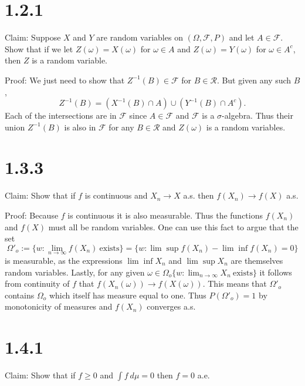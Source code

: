 \documentclass[10pt]{article}
\begin{document}
\section*{1.2.1}

Claim: Suppose $X$ and $Y$ are random variables on 
$(\Omega, \mathcal{F}, P)$ and let $A \in \mathcal{F}$.
Show that if we let $Z(\omega) = X(\omega)$ for $\omega \in A$
and $Z(\omega) = Y(\omega)$ for $\omega \in A^c$,
then $Z$ is a random variable.

Proof: We just need to show that $Z^{-1}(B) \in \mathcal{F}$
for $B \in \mathcal{R}$. But given any such $B$,
\begin{equation*}
  Z^{-1}(B) = (X^{-1}(B) \cap A) \cup (Y^{-1}(B) \cap A^c).
\end{equation*}
Each of the intersections are in $\mathcal{F}$ 
since $A \in \mathcal{F}$ and $\mathcal{F}$ is a $\sigma$-algebra.
Thus their union $Z^{-1}(B)$ is also in $\mathcal{F}$
for any $B \in \mathcal{R}$ and $Z(\omega)$ is 
a random variables. 

\section*{1.3.3}

Claim: Show that if $f$ is continuous and $X_n \to X$ a.s.
then $f(X_n) \to f(X)$ a.s.

Proof: Because $f$ is continuous it is also measurable.
Thus the functions $f(X_n)$ and $f(X)$ must all be random variables.
One can use this fact to argue that the set
\begin{equation*}
  \Omega'_o:= \{w: \lim_{n \to \infty} f(X_n) \ \text{exists}\}
  = \{w: \lim \sup f(X_n) - \lim \inf f(X_n) = 0\}
\end{equation*}
is measurable, as the expressions $\lim \inf X_n$ and $\lim \sup X_n$
are themselves random variables.
Lastly, for any given 
$\omega \in \Omega_o \{w: \lim_{n \to \infty} X_n \ \text{exists}\}$
it follows from continuity of $f$ that $f(X_n(\omega)) \to f(X(\omega))$.
This means that $\Omega'_o$ contains $\Omega_o$ which itself has measure
equal to one. Thus $P(\Omega'_o) = 1$ by monotonicity of measures 
and $f(X_n)$ converges a.s.

\section*{1.4.1}

Claim: Show that if $f \ge 0$ and $\int f\ d\mu = 0$ then $f = 0$ a.e.
\end{document}
